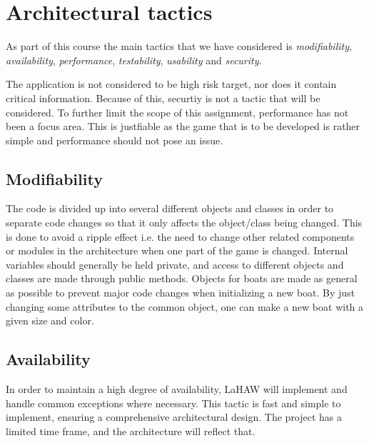\chapter{Architectural tactics}
As part of this course the main tactics that we have considered is \emph{modifiability}, \emph{availability}, \emph{performance}, \emph{testability}, \emph{usability} and \emph{security}.

The application is not considered to be high risk target, nor does it contain critical information. Because of this, securtiy is not a tactic that will be considered. To further limit the scope of this assignment, performance has not been a focus area. This is justfiable as the game that is to be developed is rather simple and performance should not pose an issue.

    \section{Modifiability}
    The code is divided up into several different objects and classes in order to separate code changes so that it only affects the object/class being changed. This is done to avoid a ripple effect i.e. the need to change other related components or modules in the architecture when one part of the game is changed\cite[p.~107]{pensum}. Internal variables should generally be held private, and access to different objects and classes are made through public methods. Objects for boats are made as general as possible to prevent major code changes when initializing a new boat. By just changing some attributes to the common object, one can make a new boat with a given size and color. 
    
    \section{Availability}
    \label{avail}
    In order to maintain a high degree of availability, LaHAW will implement and handle common exceptions where necessary. This tactic is fast and simple to implement, ensuring a comprehensive architectural design. The project has a limited time frame, and the architecture will reflect that.
    
    
